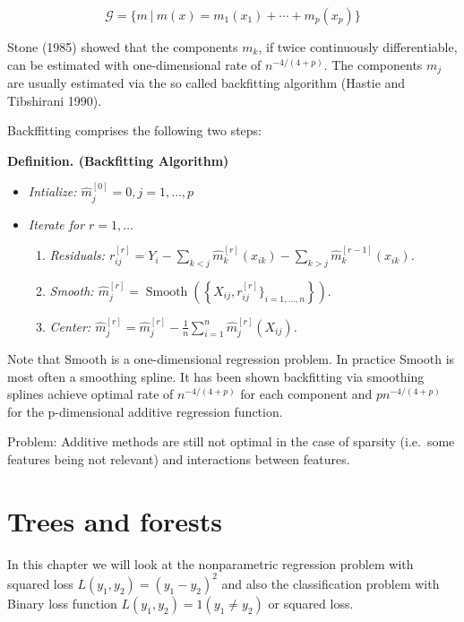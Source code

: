 \documentclass[a4paper,12pt,openany]{book}
\providecommand{\tightlist}{%
 \setlength{\itemsep}{0pt}\setlength{\parskip}{0pt}}
\begin{document}
\[
\mathcal G=\{m\ |\ m(x)=m_1(x_1)+\cdots +m_p(x_p)\}
\]

Stone (1985) showed that the components \(m_k\), if twice continuously differentiable, can be estimated with one-dimensional rate of \(n^{-4/(4+p)}\). The components \(m_j\) are usually estimated via the so called backfitting algorithm (Hastie and Tibshirani 1990).

Backffitting comprises the following two steps:

\textbf{Definition. (Backfitting Algorithm)}

\begin{itemize}
\tightlist
\item
  \emph{Intialize: \(\hat m_j^{[0]}=0, j=1,\dots,p\)}
\item
  \emph{Iterate for \(r=1,\dots\)}

  \begin{enumerate}
  \def\labelenumi{\arabic{enumi}.}
  \tightlist
  \item
    \emph{Residuals: \(r_{ij}^{[r]}=Y_i-\sum_{k < j} \hat{m}_{k}^{[r]}(x_{ik})-\sum_{k > j} \hat{m}_{k}^{[r-1]}(x_{ik})\).}
  \item
    \emph{Smooth: \(\hat{m}_j^{[r]}=\operatorname{Smooth}\left(\left\{X_{ij},r_{ij}^{[r]}\}_{i=1,\dots,n}\right\}\right).\)}
  \item
    \emph{Center: \(\hat{m}_j^{[r]}=\hat{m}_j^{[r]}-\frac{1}{n} \sum_{i=1}^n \hat{m}_j^{[r]}\left(X_{i j}\right)\).}
  \end{enumerate}
\end{itemize}

Note that Smooth is a one-dimensional regression problem. In practice Smooth is most often a smoothing spline.
It has been shown backfitting via smoothing splines achieve optimal rate of \(n^{-4/(4+p)}\) for each component and \(pn^{-4/(4+p)}\) for the p-dimensional additive regression function.

Problem: Additive methods are still not optimal in the case of sparsity (i.e.~some features being not relevant) and interactions between features.

\hypertarget{trees-and-forests}{%
\section{Trees and forests}\label{trees-and-forests}}

In this chapter we will look at the nonparametric regression problem with squared loss \(L(y_1,y_2)=(y_1-y_2)^2\) and also the classification problem with Binary loss function \(L(y_1,y_2)= 1(y_1\neq y_2)\) or squared loss.
\end{document}
